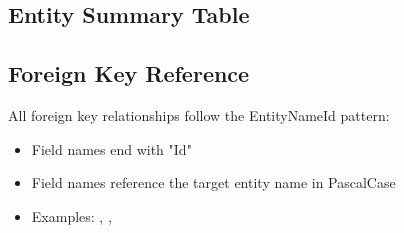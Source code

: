 
\subsection{Entity Summary Table}
\label{sec:entity-summary}


\subsection{Foreign Key Reference}
\label{sec:foreign-key-reference}

\begin{normative}[title=Foreign Key Conventions]
All foreign key relationships \MUST{} follow the EntityNameId pattern:
\begin{itemize}
    \item Field names \MUST{} end with "Id"
    \item Field names \MUST{} reference the target entity name in PascalCase
    \item Examples: , , 
\end{itemize}
\end{normative}